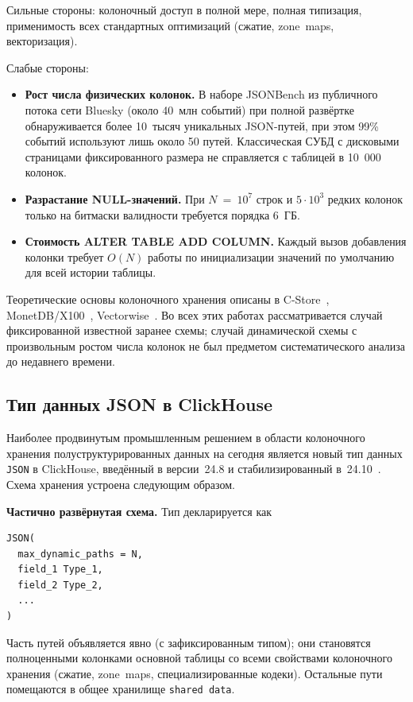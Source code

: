 Сильные стороны: колоночный доступ в полной мере, полная типизация,
применимость всех стандартных оптимизаций (сжатие, zone~maps,
векторизация).

Слабые стороны:

\begin{itemize}
    \item \textbf{Рост числа физических колонок.} В наборе JSONBench
    из публичного потока сети Bluesky (около 40~млн событий) при
    полной развёртке обнаруживается более 10~тысяч уникальных
    JSON-путей, при этом 99\% событий используют лишь около 50
    путей. Классическая СУБД с дисковыми страницами фиксированного
    размера не справляется с таблицей в 10~000 колонок.
    \item \textbf{Разрастание NULL-значений.} При $N~=~10^7$ строк и
    $5\cdot 10^3$ редких колонок только на битмаски валидности
    требуется порядка 6~ГБ.
    \item \textbf{Стоимость ALTER TABLE ADD COLUMN.} Каждый вызов
    добавления колонки требует $O(N)$ работы по инициализации
    значений по умолчанию для всей истории таблицы.
\end{itemize}

Теоретические основы колоночного хранения описаны в
C-Store~\cite{cstore}, MonetDB/X100~\cite{monetdb-x100},
Vectorwise~\cite{vectorwise}. Во всех этих работах рассматривается
случай фиксированной известной заранее схемы; случай динамической
схемы с произвольным ростом числа колонок не был предметом
систематического анализа до недавнего времени.

\subsection{Тип данных JSON в ClickHouse}

Наиболее продвинутым промышленным решением в области колоночного
хранения полуструктурированных данных на сегодня является новый
тип данных \texttt{JSON} в ClickHouse, введённый в версии~24.8 и
стабилизированный в~24.10~\cite{clickhouse-json}. Схема хранения
устроена следующим образом.

\textbf{Частично развёрнутая схема.} Тип декларируется как
\begin{verbatim}
JSON(
  max_dynamic_paths = N,
  field_1 Type_1,
  field_2 Type_2,
  ...
)
\end{verbatim}

Часть путей объявляется явно (с зафиксированным типом); они
становятся полноценными колонками основной таблицы со всеми
свойствами колоночного хранения (сжатие, zone~maps,
специализированные кодеки). Остальные пути помещаются в общее
хранилище \texttt{shared~data}.

